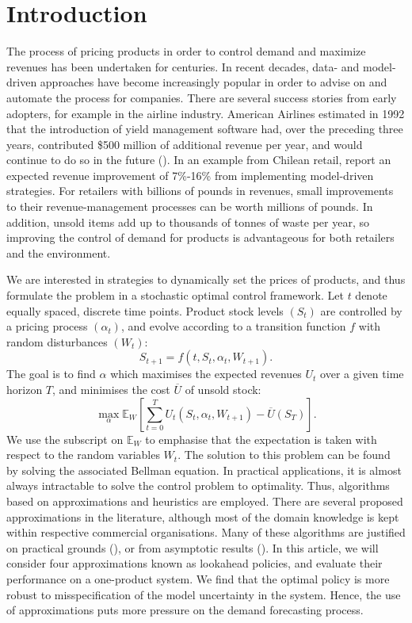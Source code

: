 \documentclass[main.tex]{subfiles}
\begin{document}
\listoftodos

\section{Introduction}
The process of pricing products in order to control demand and
maximize revenues has been undertaken for centuries. In recent
decades, data- and model-driven approaches have become increasingly
popular in order to advise on and automate the process for companies.
There are several success stories from early adopters, for example in
the airline industry. American Airlines estimated in 1992 that
the introduction of yield management software had, over the preceding
three years, contributed \$500 million of additional revenue per year,
and would continue to do so in the future (\citet{smith1992yield}).
In an example from Chilean retail, \citet{bitran1998coordinating}
report an expected revenue improvement of 7\%-16\% from implementing
model-driven strategies.
For retailers with billions of pounds in revenues, small
improvements to their revenue-management processes can be worth millions
of pounds.
In addition, unsold items add up to thousands of tonnes of waste per year, so
improving the control of demand for products is advantageous
for both retailers and the environment.

We are interested in strategies to dynamically set the prices of
products, and thus
formulate the problem in a stochastic optimal control framework.
Let $t$ denote equally spaced, discrete time points.
Product stock levels $(S_t)$ are controlled by a pricing process
$(\alpha_t)$, and evolve according to a transition function $f$ with random disturbances
$(W_t)$:
\begin{equation}
  S_{t+1}=f(t,S_t,\alpha_t,W_{t+1}).
\end{equation}
The goal is to find $\alpha$ which maximises the expected revenues $U_t$ over a
given time horizon $T$, and
minimises the cost $\overline{U}$ of unsold stock:
\begin{equation}
  \max_{\alpha}\mathbb E_W\left[ \sum_{t=0}^TU_t(S_t,\alpha_t,W_{t+1})
    - \overline{U}(S_T)\right].
\end{equation}
We use the subscript on $\mathbb E_W$ to emphasise that the
expectation is taken with respect to the random variables $W_t$.
The solution to this problem can be found by solving the associated
Bellman equation. In practical applications, it is almost always
intractable to solve the control problem to optimality.
Thus, algorithms based on approximations and heuristics are employed.
There are several proposed approximations in the
literature, although most of the domain knowledge is kept within
respective commercial organisations.
Many of these algorithms are justified on practical grounds
(\citet{aviv2012dynamic}), or
from asymptotic results (\citet{gallego1994optimal}).
In this article, we will consider four approximations known as
lookahead policies,
and evaluate their performance on a one-product system.
We find that the optimal policy is more robust to
misspecification of the model uncertainty in the system.
Hence, the use of approximations puts more pressure on the
demand forecasting process.
\end{document}
